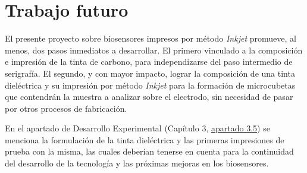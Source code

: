 \section{Trabajo futuro}
El presente proyecto sobre biosensores impresos por método \textit{Inkjet} promueve, al menos, dos pasos inmediatos a desarrollar. El primero vinculado a la composición e impresión de la tinta de carbono, para independizarse del paso intermedio de serigrafía. El segundo, y con mayor impacto, lograr la composición de una tinta dieléctrica y su impresión por método \textit{Inkjet} para la formación de microcubetas que contendrán la muestra a analizar sobre el electrodo, sin necesidad de pasar por otros procesos de fabricación.

En el apartado de Desarrollo Experimental (Capítulo 3, \hyperref[sec:tinta_dielec]{apartado 3.5}) se menciona la formulación de la tinta dieléctrica y las primeras impresiones de prueba con la misma, las cuales deberían tenerse en cuenta para la continuidad del desarrollo de la tecnología y las próximas mejoras en los biosensores.

\nocite{Banica}
\nocite{Prudenziati}
\nocite{Voros}
\nocite{Poc}
\nocite{PosterPoc1}
\nocite{DMPDatasheet}
\nocite{AgParticlesDimatix1}
\nocite{AgParticlesDimatix2}